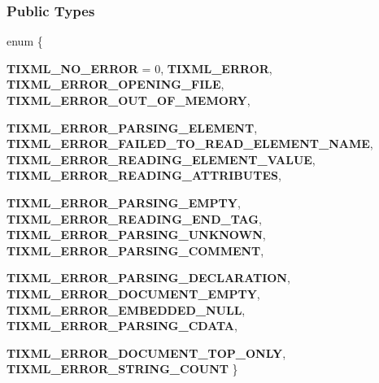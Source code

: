 \subsubsection*{Public Types}
\begin{DoxyCompactItemize}
\item 
enum \{ \par
{\bfseries TIXML\_\-NO\_\-ERROR} =  0, 
{\bfseries TIXML\_\-ERROR}, 
{\bfseries TIXML\_\-ERROR\_\-OPENING\_\-FILE}, 
{\bfseries TIXML\_\-ERROR\_\-OUT\_\-OF\_\-MEMORY}, 
\par
{\bfseries TIXML\_\-ERROR\_\-PARSING\_\-ELEMENT}, 
{\bfseries TIXML\_\-ERROR\_\-FAILED\_\-TO\_\-READ\_\-ELEMENT\_\-NAME}, 
{\bfseries TIXML\_\-ERROR\_\-READING\_\-ELEMENT\_\-VALUE}, 
{\bfseries TIXML\_\-ERROR\_\-READING\_\-ATTRIBUTES}, 
\par
{\bfseries TIXML\_\-ERROR\_\-PARSING\_\-EMPTY}, 
{\bfseries TIXML\_\-ERROR\_\-READING\_\-END\_\-TAG}, 
{\bfseries TIXML\_\-ERROR\_\-PARSING\_\-UNKNOWN}, 
{\bfseries TIXML\_\-ERROR\_\-PARSING\_\-COMMENT}, 
\par
{\bfseries TIXML\_\-ERROR\_\-PARSING\_\-DECLARATION}, 
{\bfseries TIXML\_\-ERROR\_\-DOCUMENT\_\-EMPTY}, 
{\bfseries TIXML\_\-ERROR\_\-EMBEDDED\_\-NULL}, 
{\bfseries TIXML\_\-ERROR\_\-PARSING\_\-CDATA}, 
\par
{\bfseries TIXML\_\-ERROR\_\-DOCUMENT\_\-TOP\_\-ONLY}, 
{\bfseries TIXML\_\-ERROR\_\-STRING\_\-COUNT}
 \}
\end{DoxyCompactItemize}
